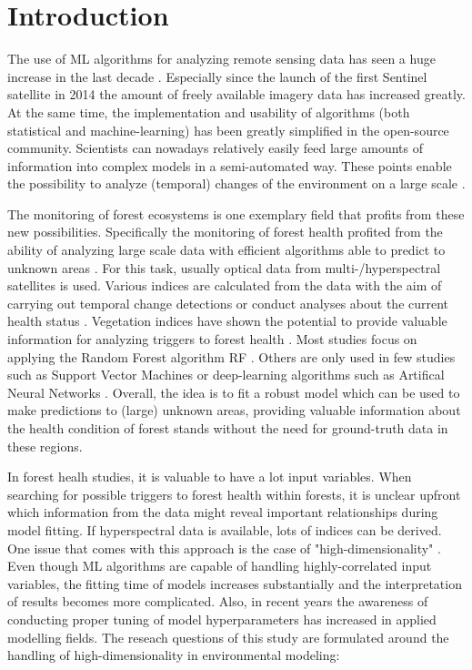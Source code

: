 \documentclass[review]{elsarticle}
\begin{document}
\section{Introduction}
\label{sec:intro}

The use of \ac{ML} algorithms for analyzing remote sensing data has seen a huge increase in the last decade \citep{lary2016}.
Especially since the launch of the first Sentinel satellite in 2014 the amount of freely available imagery data has increased greatly.
At the same time, the implementation and usability of algorithms (both statistical and machine-learning) has been greatly simplified in the open-source community.
Scientists can nowadays relatively easily feed large amounts of information into complex models in a semi-automated way.
These points enable the possibility to analyze (temporal) changes of the environment on a large scale \citep{ma2015}.

The monitoring of forest ecosystems is one exemplary field that profits from these new possibilities.
Specifically the monitoring of forest health profited from the ability of analyzing large scale data with efficient algorithms able to predict to unknown areas \citep{hawrylo2018, mascaro2014}.
For this task, usually optical data from multi-/hyperspectral satellites is used.
Various indices are calculated from the data with the aim of carrying out temporal change detections \citep{zhang2016} or conduct analyses about the current health status \citep{townsend2012}.
Vegetation indices have shown the potential to provide valuable information for analyzing triggers to forest health \citep{jiang2014, adamczyk2015}.
Most studies focus on applying the Random Forest algorithm \ac{RF} \citep{belgiu2016, lary2016, michez2016}.
Others are only used in few studies such as Support Vector Machines \citep{clark2018} or deep-learning algorithms such as Artifical Neural Networks \citep{ingram2005, rocha2018}.
Overall, the idea is to fit a robust model which can be used to make predictions to (large) unknown areas, providing valuable information about the health condition of forest stands without the need for ground-truth data in these regions.

In forest healh studies, it is valuable to have a lot input variables.
When searching for possible triggers to forest health within forests, it is unclear upfront which information from the data might reveal important relationships during model fitting.
If hyperspectral data is available, lots of indices can be derived.
One issue that comes with this approach is the case of "high-dimensionality" \citep{trunk1979, xu2016}.
Even though \ac{ML} algorithms are capable of handling highly-correlated input variables, the fitting time of models increases substantially and the interpretation of results becomes more complicated.
Also, in recent years the awareness of conducting proper tuning of model hyperparameters has increased in applied modelling fields.
The reseach questions of this study are formulated around the handling of high-dimensionality in environmental modeling:
\end{document}
